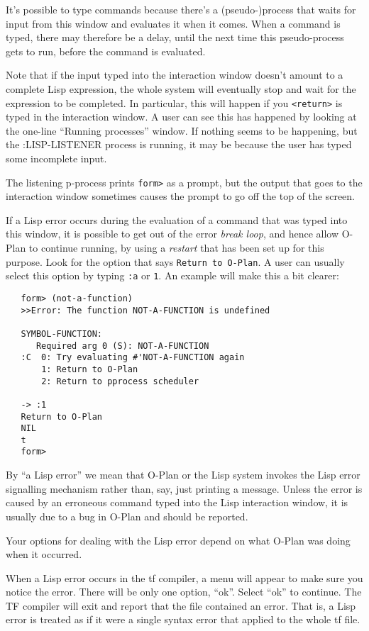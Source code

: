 It's possible to type commands because there's a (pseudo-)process that
waits for input from this window and evaluates it when it comes.  When
a command is typed, there may therefore be a delay, until the next
time this pseudo-process gets to run, before the command is evaluated.

Note that if the input typed into the interaction window doesn't
amount to a complete Lisp expression, the whole system will eventually
stop and wait for the expression to be completed.  In particular, this
will happen if you {\tt <return>} is typed in the interaction window.
A user can see this has happened by looking at the one-line ``Running
processes'' window.  If nothing seems to be happening, but the
:LISP-LISTENER process is running, it may be because the user has
typed some incomplete input.

The listening p-process prints {\tt form>} as a prompt, but the
output that goes to the interaction window sometimes causes the prompt
to go off the top of the screen.

If a Lisp error occurs during the evaluation of a command that was
typed into this window, it is possible to get out of the error {\em
break loop}, and hence allow O-Plan to continue running, by using a
{\em restart} that has been set up for this purpose.  Look for the
option that says {\tt Return to O-Plan}.  A user can usually select
this option by typing {\tt :a} or {\tt 1}.  An example will make this
a bit clearer:

\begin{verbatim} 
   form> (not-a-function)
   >>Error: The function NOT-A-FUNCTION is undefined

   SYMBOL-FUNCTION:
      Required arg 0 (S): NOT-A-FUNCTION
   :C  0: Try evaluating #'NOT-A-FUNCTION again
       1: Return to O-Plan
       2: Return to pprocess scheduler

   -> :1
   Return to O-Plan
   NIL
   t
   form>
\end{verbatim}

By ``a Lisp error'' we mean that O-Plan or the Lisp system invokes the
Lisp error signalling mechanism rather than, say, just printing a
message.  Unless the error is caused by an erroneous command typed
into the Lisp interaction window, it is usually due to a bug in
O-Plan and should be reported.

Your options for dealing with the Lisp error depend on what O-Plan
was doing when it occurred.

When a Lisp error occurs in the {\sc tf} compiler, a menu will appear
to make sure you notice the error.  There will be only one option,
``ok''.  Select ``ok'' to continue.  The TF compiler will exit and report
that the file contained an error.  That is, a Lisp error is treated as
if it were a single syntax error that applied to the whole {\sc tf}
file.

